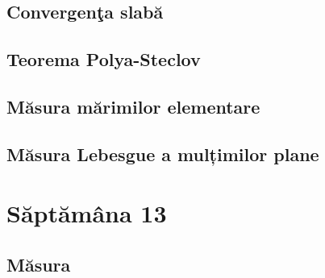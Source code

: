 \documentclass[a4paper,12pt]{article}
\theoremstyle{change}
\begin{document}

\subsection{Convergenţa slabă}

\subsection{Teorema Polya-Steclov}


\subsection{Măsura mărimilor elementare}

\subsection{Măsura Lebesgue a mulțimilor plane}

\section{Săptămâna 13}


\subsection{Măsura}
\end{document}
